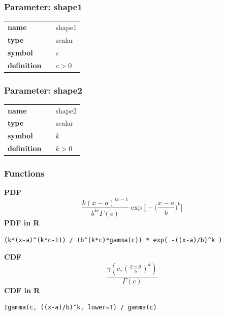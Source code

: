 \subsubsection*{Parameter: shape1}

\noindent\begin{tabular}{p{2cm}cl}
\textbf{name} & & shape1 \\
\textbf{type} & & scalar \\
\textbf{symbol} & & $c$  \\
\textbf{definition} & & $c > 0$
\end{tabular}
\subsubsection*{Parameter: shape2}

\noindent\begin{tabular}{p{2cm}cl}
\textbf{name} & & shape2 \\
\textbf{type} & & scalar \\
\textbf{symbol} & & $k$  \\
\textbf{definition} & & $k > 0$
\end{tabular}
\subsubsection*{Functions}

\smallskip \noindent \hspace{.2cm} \textbf{PDF} 
\begin{equation*}\frac{k (x-a)^{kc-1}}{b^{kc}\Gamma(c)}\exp\Big[-\Big(\frac{x-a}{b}\Big)^k\Big]\end{equation*}
\smallskip \noindent \hspace{.2cm} \textbf{PDF in R}  
\begin{verbatim}(k*(x-a)^(k*c-1)) / (b^(k*c)*gamma(c)) * exp( -((x-a)/b)^k )\end{verbatim}
\smallskip \noindent \hspace{.2cm} \textbf{CDF} 
\begin{equation*}\frac{\gamma(c,(\frac{x-a}{b})^k)}{\Gamma(c)}\end{equation*}
\smallskip \noindent \hspace{.2cm} \textbf{CDF in R} 
\begin{verbatim}Igamma(c, ((x-a)/b)^k, lower=T) / gamma(c)\end{verbatim}
\smallskip
